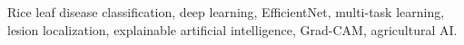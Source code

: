 \begin{IEEEkeywords}
Rice leaf disease classification, deep learning, EfficientNet, multi-task learning, lesion localization, explainable artificial intelligence, Grad-CAM, agricultural AI.
\end{IEEEkeywords}
